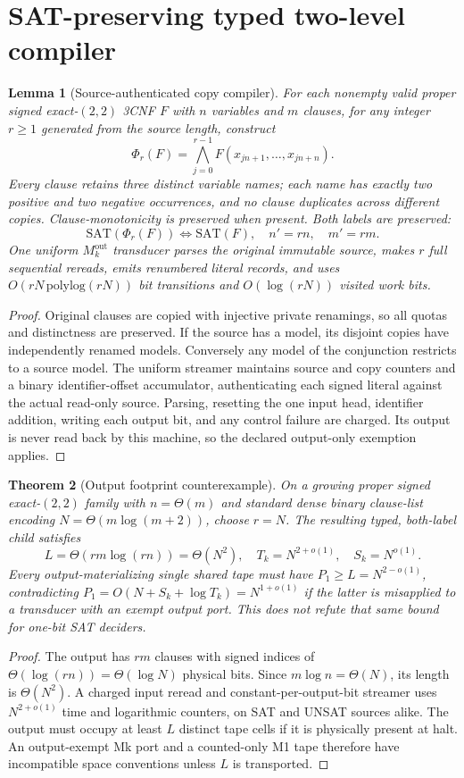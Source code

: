 \documentclass[11pt]{article}
\newtheorem{theorem}{Theorem}
\newtheorem{lemma}[theorem]{Lemma}
\begin{document}
\section{SAT-preserving typed two-level compiler}
\begin{lemma}[Source-authenticated copy compiler]
For each nonempty valid proper signed exact-$(2,2)$ 3CNF $F$ with $n$ variables and $m$ clauses, for any integer $r\ge1$ generated from the source length, construct
\[
 \Phi_r(F)=\bigwedge_{j=0}^{r-1} F(x_{jn+1},\ldots,x_{jn+n}).
\]
Every clause retains three distinct variable names; each name has exactly two positive and two negative occurrences, and no clause duplicates across different copies. Clause-monotonicity is preserved when present. Both labels are preserved:
\[
 \mathrm{SAT}(\Phi_r(F))\iff\mathrm{SAT}(F),\quad n'=rn,\quad m'=rm.
\]
One uniform $M_k^{\mathrm{out}}$ transducer parses the original immutable source, makes $r$ full sequential rereads, emits renumbered literal records, and uses $O(rN\,\mathrm{polylog}(rN))$ bit transitions and $O(\log(rN))$ visited work bits.
\end{lemma}
\begin{proof}
Original clauses are copied with injective private renamings, so all quotas and distinctness are preserved. If the source has a model, its disjoint copies have independently renamed models. Conversely any model of the conjunction restricts to a source model. The uniform streamer maintains source and copy counters and a binary identifier-offset accumulator, authenticating each signed literal against the actual read-only source. Parsing, resetting the one input head, identifier addition, writing each output bit, and any control failure are charged. Its output is never read back by this machine, so the declared output-only exemption applies.
\end{proof}
\begin{theorem}[Output footprint counterexample]\label{out}
On a growing proper signed exact-$(2,2)$ family with $n=\Theta(m)$ and standard dense binary clause-list encoding $N=\Theta(m\log(m+2))$, choose $r=N$. The resulting typed, both-label child satisfies
\[
 L=\Theta(rm\log(rn))=\Theta(N^2),\quad
 T_k=N^{2+o(1)},\quad S_k=N^{o(1)}.
\]
Every output-materializing single shared tape must have $P_1\ge L=N^{2-o(1)}$, contradicting $P_1=O(N+S_k+\log T_k)=N^{1+o(1)}$ if the latter is misapplied to a transducer with an exempt output port. This does not refute that same bound for one-bit SAT deciders.
\end{theorem}
\begin{proof}
The output has $rm$ clauses with signed indices of $\Theta(\log(rn))=\Theta(\log N)$ physical bits. Since $m\log n=\Theta(N)$, its length is $\Theta(N^2)$. A charged input reread and constant-per-output-bit streamer uses $N^{2+o(1)}$ time and logarithmic counters, on SAT and UNSAT sources alike. The output must occupy at least $L$ distinct tape cells if it is physically present at halt. An output-exempt Mk port and a counted-only M1 tape therefore have incompatible space conventions unless $L$ is transported.
\end{proof}
\end{document}
